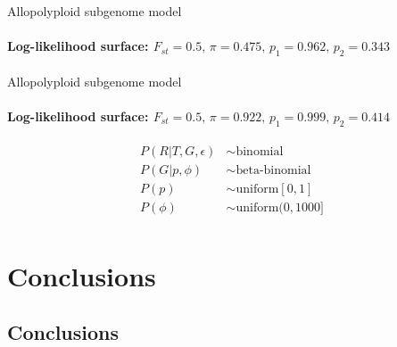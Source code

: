 \documentclass[presentation,sansserif]{beamer}
\begin{document}
{  %
\begin{frame}[c,plain]{Allopolyploid subgenome model}
	\framesubtitle{Log-likelihood surface: $F_{st}=0.5,\, \pi=0.475,\, p_1=0.962,\, p_2=0.343$}
	\begin{center}
	\end{center}
\end{frame}
}

{  %
\begin{frame}[c,plain]{Allopolyploid subgenome model}
	\framesubtitle{Log-likelihood surface: $F_{st}=0.5,\, \pi=0.922,\, p_1=0.999,\, p_2=0.414$}
	\begin{center}
	\end{center}
\end{frame}
}

\begin{frame}[c,plain]{}

	\begin{align*}
		P(R|T,G,\epsilon) &\sim \text{binomial} \\[0.075in]
		P(G|p,\phi) &\sim \text{beta-binomial} \\[0.075in]
		P(p) &\sim \text{uniform}[0,1] \\[0.075in]
		P(\phi) &\sim \text{uniform}(0,1000] \\[0.075in]
	\end{align*}

\end{frame}

\section{Conclusions}

\subsection*{Conclusions}
\end{document}
